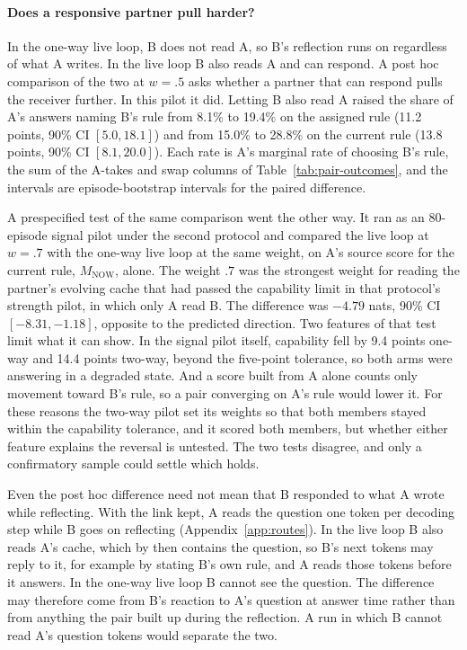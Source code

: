 

\paragraph{Does a responsive partner pull harder?}
In the one-way live loop, B does not read A, so B's reflection runs on
regardless of what A writes. In the live loop B also reads A and can
respond. A post hoc comparison of the two at $w=.5$ asks whether a
partner that can respond pulls the receiver further. In this pilot it
did. Letting B also read A raised the share of A's answers naming B's
rule from 8.1\% to 19.4\% on the assigned rule (11.2 points,
90\% CI $[5.0,18.1]$) and from 15.0\% to 28.8\% on the current rule
(13.8 points, 90\% CI $[8.1,20.0]$). Each rate is A's marginal rate of
choosing B's rule, the sum of the A-takes and swap columns of
Table~\ref{tab:pair-outcomes}, and the intervals are episode-bootstrap
intervals for the paired difference.

A prespecified test of the same comparison went the other way. It ran
as an 80-episode signal pilot under the second protocol and compared
the live loop at $w=.7$ with the one-way live loop at the same weight,
on A's source score for the current rule, $M_{\mathrm{NOW}}$, alone. The
weight $.7$ was the strongest weight for reading the partner's evolving
cache that had passed the capability limit in that protocol's strength
pilot, in which only A read B. The
difference was $-4.79$ nats, 90\% CI $[-8.31,-1.18]$, opposite to the
predicted direction. Two features of that test limit what it can show.
In the signal pilot itself, capability fell by 9.4 points one-way and
14.4 points two-way, beyond the five-point tolerance, so both arms were
answering in a degraded state. And a score built from A alone counts
only movement toward B's rule, so a pair converging on A's rule would
lower it. For these reasons the two-way pilot set its weights so that
both members stayed within the capability tolerance, and it scored both
members, but whether either feature explains the reversal is untested. The two tests disagree, and
only a confirmatory sample could settle which holds.

Even the post hoc difference need not mean that B responded to what A
wrote while reflecting. With the link kept, A reads the question one
token per decoding step while B goes on reflecting
(Appendix~\ref{app:routes}). In the live loop B also reads A's cache,
which by then contains the question, so B's next tokens may reply to it,
for example by stating B's own rule, and A reads those tokens before
it answers. In the one-way live loop B cannot see the question. The
difference may therefore come from B's reaction to A's question at
answer time rather than from anything the pair built up during the
reflection. A run in which B cannot read A's question tokens would
separate the two.

